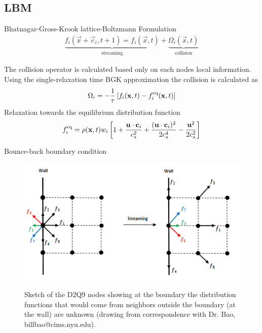 \subsection{LBM}
\begin{frame}{Bhatnagar-Gross-Krook lattice-Boltzmann Formulation}
\begin{align}
	\underbrace{f_i(\vec{x}+\vec{c}_i, t + 1)  = f_i(\vec{x},t)}_\text{streaming}  + \underbrace{\Omega_i(\vec{x},t)}_\text{collision}
\end{align}

The collision operator is calculated based only on each nodes local information. Using the single-relaxation time BGK approximation the collision is calculated as
\begin{align}
	\Omega_i = -\frac{1}{\tau}\left[f_i(\mathbf{x},t) - f_i^{\text{eq}}(\mathbf{x},t)\right]
\end{align}
Relaxation towards the equilibrium distribution function
\begin{equation}\label{eq:equilib-dist-function}
	f_i^{\text{eq}} = \rho(\mathbf{x},t)w_i\left[1+\frac{\mathbf{u}\cdot\mathbf{c}_i}{c_s^2} + \frac{(\mathbf{u}\cdot\mathbf{c}_i)^2}{2c_s^4} - \frac{\mathbf{u}^2}{2c_s^2} \right]
\end{equation}

\end{frame}

\begin{frame}
Bounce-back boundary condition
\begin{figure}[t]
	\centering
	\includegraphics[width=0.5\linewidth]{chapters/figures/lbm/ongrid}\label{fig:wall-lattice-bc}
	\caption{Sketch of the D2Q9 nodes showing at the boundary the distribution functions that would come from neighbors outside the boundary (at the wall) are unknown (drawing from correspondence with Dr. Bao, billbao@cims.nyu.edu).}
\end{figure}
\end{frame}